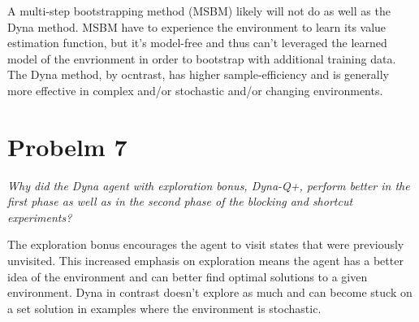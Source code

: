 \documentclass{article}
\begin{document}
A multi-step bootstrapping method (MSBM) likely will not do as well as the Dyna method. MSBM have to experience the environment to learn its value estimation function, but it's model-free and thus can't leveraged the learned model of the envrionment in order to bootstrap with additional training data. The Dyna method, by ocntrast, has higher sample-efficiency and is generally more effective in complex and/or stochastic and/or changing environments.

\section*{Probelm 7}

\textit{Why did the Dyna agent with exploration bonus, Dyna-Q+, perform better in the first phase as well as in the second phase of the blocking and shortcut experiments?}

The exploration bonus encourages the agent to visit states that were previously unvisited. This increased emphasis on exploration means the agent has a better idea of the environment and can better find optimal solutions to a given environment. Dyna in contrast doesn't explore as much and can become stuck on a set solution in examples where the environment is stochastic.
\end{document}
